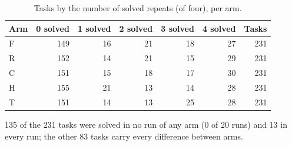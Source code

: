 \begin{table}[!htb]
\centering
\caption{Tasks by the number of solved repeats (of four), per arm.}\label{tab:s-taskhist}
\footnotesize
\begin{tabular}{lrrrrrr}
\toprule
Arm & 0 solved & 1 solved & 2 solved & 3 solved & 4 solved & Tasks \\
\midrule
F & 149 & 16 & 21 & 18 & 27 & 231 \\
R & 152 & 14 & 21 & 15 & 29 & 231 \\
C & 151 & 15 & 18 & 17 & 30 & 231 \\
H & 155 & 21 & 13 & 14 & 28 & 231 \\
T & 151 & 14 & 13 & 25 & 28 & 231 \\
\bottomrule
\end{tabular}

\par\smallskip\parbox{0.96\linewidth}{\footnotesize 135 of the 231 tasks were solved in no run of any arm (0 of 20 runs) and 13 in every run; the other 83 tasks carry every difference between arms.}
\end{table}
